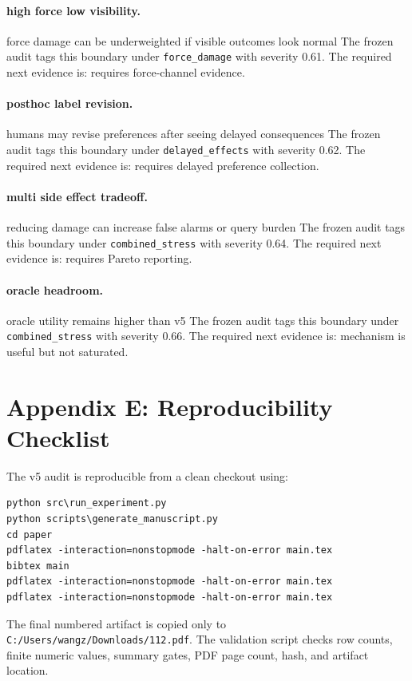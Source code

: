 \documentclass{article}
\begin{document}
\paragraph{high force low visibility.} force damage can be underweighted if visible outcomes look normal The frozen audit tags this boundary under \texttt{force\_damage} with severity 0.61. The required next evidence is: requires force-channel evidence.

\paragraph{posthoc label revision.} humans may revise preferences after seeing delayed consequences The frozen audit tags this boundary under \texttt{delayed\_effects} with severity 0.62. The required next evidence is: requires delayed preference collection.

\paragraph{multi side effect tradeoff.} reducing damage can increase false alarms or query burden The frozen audit tags this boundary under \texttt{combined\_stress} with severity 0.64. The required next evidence is: requires Pareto reporting.

\paragraph{oracle headroom.} oracle utility remains higher than v5 The frozen audit tags this boundary under \texttt{combined\_stress} with severity 0.66. The required next evidence is: mechanism is useful but not saturated.

\section*{Appendix E: Reproducibility Checklist}
The v5 audit is reproducible from a clean checkout using:
\begin{verbatim}
python src\run_experiment.py
python scripts\generate_manuscript.py
cd paper
pdflatex -interaction=nonstopmode -halt-on-error main.tex
bibtex main
pdflatex -interaction=nonstopmode -halt-on-error main.tex
pdflatex -interaction=nonstopmode -halt-on-error main.tex
\end{verbatim}
The final numbered artifact is copied only to \texttt{C:/Users/wangz/Downloads/112.pdf}. The validation script checks row counts, finite numeric values, summary gates, PDF page count, hash, and artifact location.
\end{document}
